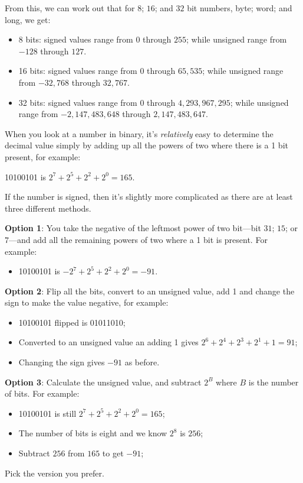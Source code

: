 From this, we can work out that for $8$; $16$; and $32$ bit numbers,
byte; word; and long, we get:
\begin{itemize}
\item 8 bits: signed values range from $0$ through $255$;  while unsigned range from $-128$ through $127$.

\item 16 bits: signed values range from $0$ through $65,535$;  while unsigned range from $-32,768$ through $32,767$.

\item 32 bits: signed values range from $0$ through $4,293,967,295$; while unsigned range from $-2,147,483,648$ through $2,147,483,647$.
\end{itemize}

When you look at a number in binary, it's \emph{relatively} easy to determine the decimal
value simply by adding up all the powers of two where there is a 1
bit present, for example:

10100101 is $2^{7}+2^{5}+2^{2}+2^{0}=165$.

If the number is signed, then it's slightly more complicated as there
are at least three different methods. 

\textbf{Option 1}: You take the negative of the leftmost power of two bit---bit $31$; $15$; or $7$---and add
all the remaining powers of two where a 1 bit is present. For example:
\begin{itemize}
\item 10100101 is $-2^{7}+2^{5}+2^{2}+2^{0}=-91$.
\end{itemize}
\textbf{Option 2}: Flip all the bits, convert to an unsigned value,
add 1 and change the sign to make the value negative, for example:
\begin{itemize}
\item 10100101 flipped is 01011010;
\item Converted to an unsigned value an adding 1 gives $2^{6}+2^{4}+2^{3}+2^{1}+1=91$;
\item Changing the sign gives $-91$ as before.
\end{itemize}
\textbf{Option 3}: Calculate the unsigned value, and subtract $2^{B}$ where $B$ is the number of bits. For example:
\begin{itemize}
\item 10100101 is still $2^{7}+2^{5}+2^{2}+2^{0}=165$;
\item The number of bits is eight and we know $2^{8}$ is $256$;
\item Subtract $256$ from $165$ to get $-91$;
\end{itemize}
Pick the version you prefer.

